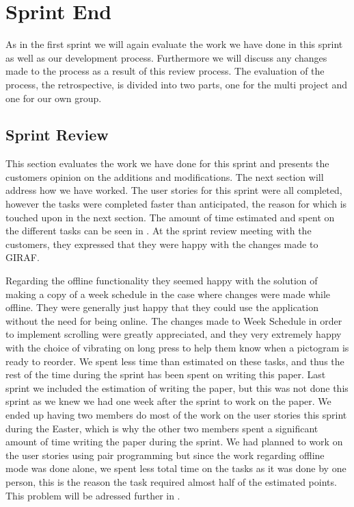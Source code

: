 \chapter{Sprint End}
As in the first sprint we will again evaluate the work we have done in this sprint as well as our development process.
Furthermore we will discuss any changes made to the process as a result of this review process.
The evaluation of the process, the retrospective, is divided into two parts, one for the multi project and one for our own group.
\section{Sprint Review}
This section evaluates the work we have done for this sprint and presents the customers opinion on the additions and modifications.
The next section will address how we have worked.
The user stories for this sprint were all completed, however the tasks were completed faster than anticipated, the reason for which is touched upon in the next section.
The amount of time estimated and spent on the different tasks can be seen in .
At the sprint review meeting with the customers, they expressed that they were happy with the changes made to GIRAF.

Regarding the offline functionality they seemed happy with the solution of making a copy of a week schedule in the case where changes were made while offline.
They were generally just happy that they could use the application without the need for being online.
The changes made to Week Schedule in order to implement scrolling were greatly appreciated, and they very extremely happy with the choice of vibrating on long press to help them know when a pictogram is ready to reorder.
We spent less time than estimated on these tasks, and thus the rest of the time during the sprint has been spent on writing this paper.
Last sprint we included the estimation of writing the paper, but this was not done this sprint as we knew we had one week after the sprint to work on the paper.
We ended up having two members do most of the work on the user stories this sprint during the Easter, which is why the other two members spent a significant amount of time writing the paper during the sprint.
We had planned to work on the user stories using pair programming but since the work regarding offline mode was done alone, we spent less total time on the tasks as it was done by one person, this is the reason the task required almost half of the estimated points.
This problem will be adressed further in .


